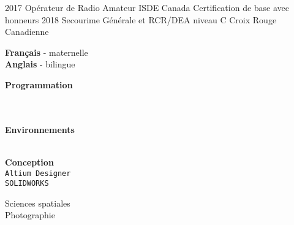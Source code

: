 \documentclass[9pt]{developercv} %
\begin{document}
\begin{minipage}[t]{0.8\textwidth}


\begin{entrylist}
	\entry
		{2017}
		{Opérateur de Radio Amateur}
		{ISDE Canada}
		{
			Certification de base avec honneurs
		}
	\entry
		{2018}
		{Secourime Générale et RCR/DEA niveau C}
		{Croix Rouge Canadienne}
		{\vspace{-14pt}}
\end{entrylist}
\end{minipage}
\begin{minipage}[t]{0.02\textwidth}
	\hfill
\end{minipage}
\begin{minipage}[t]{0.18\textwidth}
		\textbf{Français} - maternelle\\
		\textbf{Anglais} - bilingue

		\textbf{Programmation}
		\begin{barchart}{1.75}
		\end{barchart}
		\\\\
		\textbf{Environnements}
		\begin{barchart}{1.75}
		\end{barchart}
		\\
		\textbf{Conception}\\
		\texttt{Altium Designer}\\
		\texttt{SOLIDWORKS}

		Sciences spatiales\\
		Photographie

\end{minipage}

\end{document}

